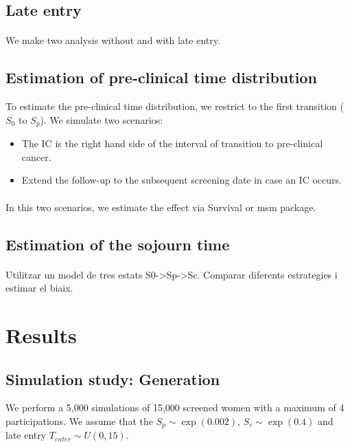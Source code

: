 \documentclass[10pt,a4paper]{article}
\begin{document}
\subsection{Late entry}
\paragraph{}We make two analysis without and with late entry.

\subsection{Estimation of pre-clinical time distribution}
To estimate the pre-clinical time distribution, we restrict to the first transition ($S_0$ to $S_p$). We simulate two scenarios: 
\begin{itemize}
\item The IC is the right hand side of the interval of transition to pre-clinical cancer.
\item Extend the follow-up to the subsequent screening date in case an IC occurs.
\end{itemize}

\paragraph{}In this two scenarios, we estimate the effect via \textmd{Survival} or \textmd{msm} package.

\subsection{Estimation of the sojourn time}
\paragraph{}Utilitzar un model de tres estats S0->Sp->Sc. Comparar diferents estrategies i estimar el biaix.

\section{Results}
\subsection{Simulation study: Generation}
We perform a 5,000 simulations of 15,000 screened women with a maximum of 4 participations. We assume that the $S_p\sim \exp(0.002)$, $S_c \sim\exp(0.4)$ and late entry $T_{enter}\sim U(0,15)$. 
\end{document}
